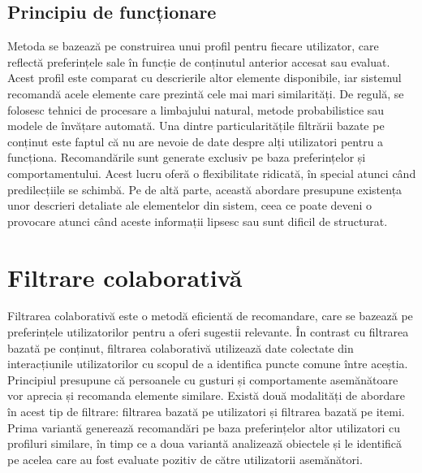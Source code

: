 \subsection{Principiu de funcționare}
\label{subsec:ch3sec1sub1}
Metoda se bazează pe construirea unui profil pentru fiecare utilizator, care reflectă preferințele sale în funcție de conținutul anterior accesat sau evaluat. 
Acest profil este comparat cu descrierile altor elemente disponibile, iar sistemul recomandă acele elemente care prezintă cele mai mari similarități.
De regulă, se folosesc tehnici de procesare a limbajului natural, metode probabilistice sau modele de învățare automată.
Una dintre particularitățile filtrării bazate pe conținut este faptul că nu are nevoie de date despre alți utilizatori pentru a funcționa. Recomandările sunt generate exclusiv pe baza preferințelor și comportamentului.
Acest lucru oferă o flexibilitate ridicată, în special atunci când predilecțiile se schimbă. Pe de altă parte, această abordare presupune existența unor descrieri detaliate ale elementelor din sistem, ceea ce poate deveni o provocare atunci când aceste informații lipsesc sau sunt dificil de structurat\cite{ISINKAYE2015261}.
\section{Filtrare colaborativă}
\label{sec:ch3sec2}
Filtrarea colaborativă este o metodă eficientă de recomandare, care se bazează pe preferințele utilizatorilor pentru a oferi sugestii relevante.
În contrast cu filtrarea bazată pe conținut, filtrarea colaborativă utilizează date colectate din interacțiunile utilizatorilor cu scopul de a identifica puncte comune între aceștia.
Principiul presupune că persoanele cu gusturi și comportamente asemănătoare vor aprecia și recomanda elemente similare.
Există două modalități de abordare în acest tip de filtrare: filtrarea bazată pe utilizatori și filtrarea bazată pe itemi.
Prima variantă generează recomandări pe baza preferințelor altor utilizatori cu profiluri similare, în timp ce a doua variantă analizează obiectele și le identifică pe acelea care au fost evaluate pozitiv de către utilizatorii asemănători\cite{schafer2007collaborative}.

